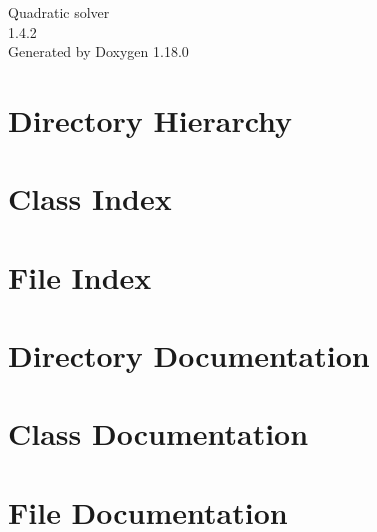 \documentclass[twoside]{book}
\newcommand{\+}{\discretionary{\mbox{\scriptsize$\hookleftarrow$}}{}{}}
\newcommand{\clearemptydoublepage}{%
    \newpage{\pagestyle{empty}\cleardoublepage}%
  }
\begin{document}
  \raggedbottom
    \hypersetup{pageanchor=false,
                bookmarksnumbered=true,
                pdfencoding=unicode
               }
  \begin{titlepage}
  \vspace*{7cm}
  \begin{center}%
  {\Large Quadratic solver}\\
  [1ex]\large 1.\+4.\+2 \\
  \vspace*{1cm}
  {\large Generated by Doxygen 1.18.0}\\
  \end{center}
  \end{titlepage}
  \clearemptydoublepage
  \tableofcontents
  \clearemptydoublepage
  \hypersetup{pageanchor=true}
\chapter{Directory Hierarchy}

\chapter{Class Index}

\chapter{File Index}

\chapter{Directory Documentation}






\chapter{Class Documentation}

\chapter{File Documentation}











  \backmatter
  \newpage
  \clearemptydoublepage
  \printindex
\end{document}
